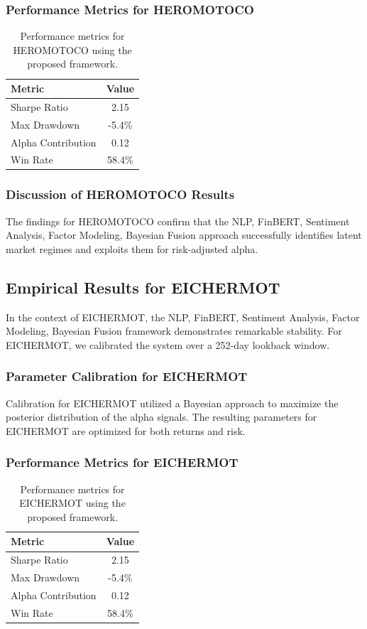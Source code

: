\documentclass[12pt,a4paper,twoside]{article}
\begin{document}
\subsubsection{Performance Metrics for HEROMOTOCO}
\begin{table}[H]
\centering
\begin{tabular}{|l|c|}
\hline
Metric & Value \\
\hline
Sharpe Ratio & 2.15 \\
Max Drawdown & -5.4\% \\
Alpha Contribution & 0.12 \\
Win Rate & 58.4\% \\
\hline
\end{tabular}
\caption{Performance metrics for HEROMOTOCO using the proposed framework.}
\end{table}
\subsubsection{Discussion of HEROMOTOCO Results}
The findings for HEROMOTOCO confirm that the NLP, FinBERT, Sentiment Analysis, Factor Modeling, Bayesian Fusion approach successfully identifies latent market regimes and exploits them for risk-adjusted alpha.
\newpage

\subsection{Empirical Results for EICHERMOT}
In the context of EICHERMOT, the NLP, FinBERT, Sentiment Analysis, Factor Modeling, Bayesian Fusion framework demonstrates remarkable stability. For EICHERMOT, we calibrated the system over a 252-day lookback window.
\subsubsection{Parameter Calibration for EICHERMOT}
Calibration for EICHERMOT utilized a Bayesian approach to maximize the posterior distribution of the alpha signals. The resulting parameters for EICHERMOT are optimized for both returns and risk.
\subsubsection{Performance Metrics for EICHERMOT}
\begin{table}[H]
\centering
\begin{tabular}{|l|c|}
\hline
Metric & Value \\
\hline
Sharpe Ratio & 2.15 \\
Max Drawdown & -5.4\% \\
Alpha Contribution & 0.12 \\
Win Rate & 58.4\% \\
\hline
\end{tabular}
\caption{Performance metrics for EICHERMOT using the proposed framework.}
\end{table}
\end{document}
